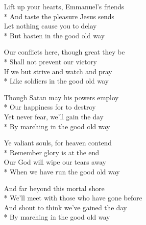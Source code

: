 

\versemark
Lift up your hearts, Emmanuel’s friends\\*
And taste the pleasure Jesus sends\\
Let nothing cause you to delay\\*
But hasten in the good old way


\versemark
Our conflicts here, though great they be\\*
Shall not prevent our victory\\
If we but strive and watch and pray\\*
Like soldiers in the good old way 

\versemark
Though Satan may his powers employ\\*
Our happiness for to destroy\\
Yet never fear, we’ll gain the day\\*
By marching in the good old way 

\versemark
Ye valiant souls, for heaven contend\\*
Remember glory is at the end\\
Our God will wipe our tears away\\*
When we have run the good old way 

\versemark
And far beyond this mortal shore\\*
We’ll meet with those who have gone before\\
And shout to think we’ve gained the day\\*
By marching in the good old way 

